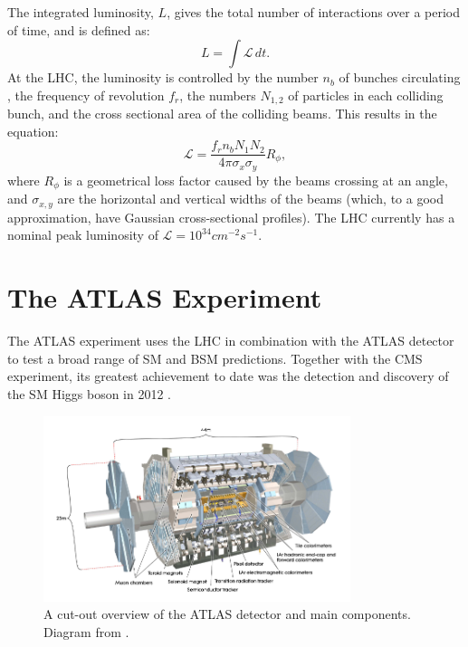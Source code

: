 The integrated luminosity, $L$, gives the total number of interactions over a period of time, and is defined as:
\begin{equation}
L = \int \mathcal{L}\, dt.
\end{equation}
At the LHC, the luminosity is controlled by the number $n_b$ of bunches circulating , the frequency of revolution $f_r$, the numbers $N_{1,2}$ of particles in each colliding bunch, and the cross sectional area of the colliding beams. This results in the equation:
\begin{equation}
\mathcal{L}  = \frac{ f_rn_bN_1N_2 }{4\pi\sigma_x\sigma_y}R_{\phi},
\end{equation}
where $R_{\phi}$ is a geometrical loss factor caused by the beams crossing at an angle, and $\sigma_{x,y}$ are the horizontal and vertical widths of the beams (which, to a good approximation, have Gaussian cross-sectional profiles). The LHC currently has a nominal peak luminosity of $\mathcal{L} = 10^{34} cm^{-2}s^{-1}$.

\section{The ATLAS Experiment}
\label{section:atlas}

The ATLAS experiment \cite{ATLASDesign} uses the LHC in combination with the ATLAS detector to test a broad range of SM and BSM predictions. Together with the CMS experiment, its greatest achievement to date was the detection and discovery of the SM Higgs boson in 2012 \cite{HiggsDiscovery}.

\begin{figure}[H]
    \centering
    \includegraphics[width=0.8\textwidth]{Figures/2/ATLASDetector.png}
    \caption{A cut-out overview of the ATLAS detector and main components. Diagram from \cite{ATLASDesign}.}
    \label{fig:atlasdec}
\end{figure}

